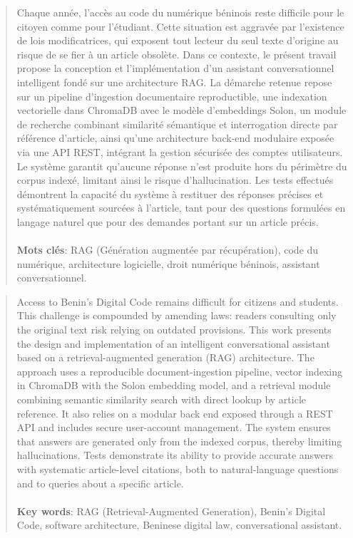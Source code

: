 \resume
{}
\vspace*{-6cm}
\begin{abstract}
Chaque année, l'accès au code du numérique béninois reste difficile pour le citoyen comme pour l'étudiant. Cette situation est aggravée par l'existence de lois modificatrices, qui exposent tout lecteur du seul texte d'origine au risque de se fier à un article obsolète. Dans ce contexte, le présent travail propose la conception et l'implémentation d'un assistant conversationnel intelligent fondé sur une architecture RAG. La démarche retenue repose sur un pipeline d'ingestion documentaire reproductible, une indexation vectorielle dans ChromaDB avec le modèle d'embeddings Solon, un module de recherche combinant similarité sémantique et interrogation directe par référence d'article, ainsi qu'une architecture back-end modulaire exposée via une API REST, intégrant la gestion sécurisée des comptes utilisateurs. Le système garantit qu'aucune réponse n'est produite hors du périmètre du corpus indexé, limitant ainsi le risque d'hallucination. Les tests effectués démontrent la capacité du système à restituer des réponses précises et systématiquement sourcées à l'article, tant pour des questions formulées en langage naturel que pour des demandes portant sur un article précis.

\paragraph{}
\textbf{Mots clés}: RAG (Génération augmentée par récupération), code du numérique, architecture logicielle, droit numérique béninois, assistant conversationnel.
\end{abstract}

\newpage
\thispagestyle{empty}
\begin{abstract}

Access to Benin's Digital Code remains difficult for citizens and students. This challenge is compounded by amending laws: readers consulting only the original text risk relying on outdated provisions. This work presents the design and implementation of an intelligent conversational assistant based on a retrieval-augmented generation (RAG) architecture. The approach uses a reproducible document-ingestion pipeline, vector indexing in ChromaDB with the Solon embedding model, and a retrieval module combining semantic similarity search with direct lookup by article reference. It also relies on a modular back end exposed through a REST API and includes secure user-account management. The system ensures that answers are generated only from the indexed corpus, thereby limiting hallucinations. Tests demonstrate its ability to provide accurate answers with systematic article-level citations, both to natural-language questions and to queries about a specific article.

\paragraph{}
\textbf{Key words}: RAG (Retrieval-Augmented Generation), Benin's Digital Code, software architecture, Beninese digital law, conversational assistant.
\end{abstract}